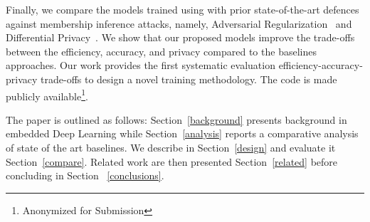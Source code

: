 Finally, we compare the models trained using \method\hspace{0.02in} with prior state-of-the-art defences against membership inference attacks, namely, Adversarial Regularization~\cite{DBLP:conf/ccs/NasrSH18} and Differential Privacy~\cite{Abadi:2016:DLD:2976749.2978318}.
We show that our proposed models improve the trade-offs between the efficiency,  accuracy, and privacy compared to the baselines approaches. Our work provides the first systematic evaluation efficiency-accuracy-privacy trade-offs to design a novel training methodology. The code is made publicly available\footnote{Anonymized for Submission}.

The paper is outlined as follows: Section~\ref{background} presents background in embedded Deep Learning while Section~\ref{analysis} reports a comparative analysis of state of the art baselines.
We describe \method\hspace{0.02in} in Section~\ref{design} and evaluate it Section~\ref{compare}. Related work are then presented Section~\ref{related} before concluding in Section ~\ref{conclusions}.

